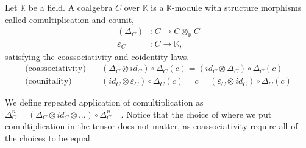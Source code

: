 \documentclass[../thesis.tex]{subfiles}
\begin{document}
            \begin{definition}[Coalgebra]
                Let $\mathbb{K}$ be a field. A coalgebra $C$ over $\mathbb{K}$ is a $\mathbb{K}$-module with structure morphisms called comultiplication and counit,
                \begin{align*}
                    (\Delta_C) & : C \rightarrow C\otimes_{\mathbb{K}}C \\
                    \varepsilon_C & : C \rightarrow \mathbb{K},
                \end{align*}
                satisfying the coassociativity and coidentity laws. 
                \begin{align*}
                    \text{(coassociativity)} \quad & (\Delta_C\otimes id_C)\circ\Delta_C(c) = (id_C\otimes\Delta_C)\circ\Delta_C(c) \\
                    \text{(counitality)} \quad & (id_C\otimes\varepsilon_C)\circ\Delta_C(c) = c = (\varepsilon_C\otimes id_C)\circ\Delta_C(c)
                \end{align*}
            \end{definition}

            We define repeated application of comultiplication as $\Delta_C^n = (\Delta_C\otimes id_C\otimes ...)\circ\Delta_C^{n-1}$. Notice that the choice of where we put comultiplication in the tensor does not matter, as coassociativity require all of the choices to be equal.
            
\end{document}

